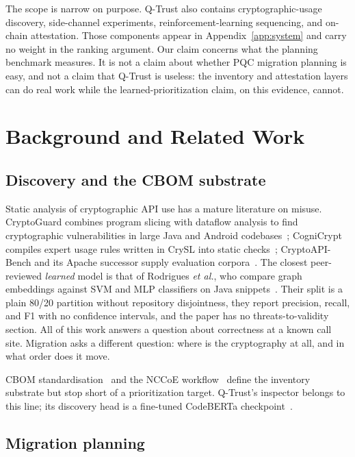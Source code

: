 \documentclass[journal,10pt]{IEEEtran}
\begin{document}
The scope is narrow on purpose. Q-Trust also contains cryptographic-usage discovery, side-channel
experiments, reinforcement-learning sequencing, and on-chain attestation. Those components appear
in Appendix~\ref{app:system} and carry no weight in the ranking argument. Our claim concerns what
the planning benchmark measures. It is not a claim about whether PQC migration planning is easy,
and not a claim that Q-Trust is useless: the inventory and attestation layers can do real work
while the learned-prioritization claim, on this evidence, cannot.

\section{Background and Related Work}

\subsection{Discovery and the CBOM substrate}

Static analysis of cryptographic API use has a mature literature on misuse. CryptoGuard combines
program slicing with dataflow analysis to find cryptographic vulnerabilities in large Java and
Android codebases~\cite{cryptoguard}; CogniCrypt compiles expert usage rules written in CrySL into
static checks~\cite{cognicrypt,crysl}; CryptoAPI-Bench and its Apache successor supply evaluation
corpora~\cite{cryptoapibench,afrose2021}. The closest peer-reviewed \emph{learned} model is that of
Rodrigues \emph{et al.}, who compare graph embeddings against SVM and MLP classifiers on Java
snippets~\cite{rodrigues2023}. Their split is a plain 80/20 partition without repository
disjointness, they report precision, recall, and F1 with no confidence intervals, and the paper has
no threats-to-validity section. All of this work answers a question about correctness at a known
call site. Migration asks a different question: where is the cryptography at all, and in what order
does it move.

CBOM standardisation~\cite{cyclonedx,ibm_cbom} and the NCCoE workflow~\cite{nccoe_pqc} define the
inventory substrate but stop short of a prioritization target. Q-Trust's inspector belongs to this
line; its discovery head is a fine-tuned CodeBERTa checkpoint~\cite{codebert,codeberta}.

\subsection{Migration planning}
\end{document}
